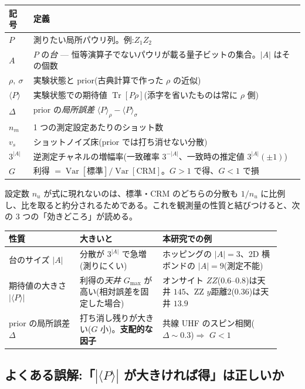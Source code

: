 \documentclass[11pt,a4paper]{ltjsarticle}
\newcommand{\ev}[1]{\langle #1\rangle}
\newcommand{\Tr}{\operatorname{Tr}}
\newcommand{\Var}{\operatorname{Var}}
\begin{document}
\begin{center}\small
\begin{tabular}{@{}ll@{}}
\toprule
記号 & 定義 \\
\midrule
$P$ & 測りたい局所パウリ列。例:$Z_1Z_2$ \\
$A$ & $P$ の\emph{台} --- 恒等演算子でないパウリが載る量子ビットの集合。$|A|$ はその個数 \\
$\rho,\ \sigma$ & 実験状態と prior(古典計算で作った $\rho$ の近似) \\
$\ev{P}$ & 実験状態での期待値 $\Tr[P\rho]$(添字を省いたものは常に $\rho$ 側) \\
$\Delta$ & prior の\emph{局所誤差} $\ev{P}_\rho-\ev{P}_\sigma$ \\
$n_m$ & 1 つの測定設定あたりのショット数 \\
$v_s$ & ショットノイズ床(prior では打ち消せない分散) \\
$3^{|A|}$ & 逆測定チャネルの増幅率(一致確率 $3^{-|A|}$、一致時の推定値 $3^{|A|}(\pm1)$) \\
$G$ & 利得 $=\Var[\text{標準}]/\Var[\text{CRM}]$。$G>1$ で得、$G<1$ で損 \\
\bottomrule
\end{tabular}
\end{center}

\noindent 設定数 $n_u$ が式に現れないのは、標準・CRM のどちらの分散も $1/n_u$ に比例し、比を取ると約分されるためである。これを観測量の性質と結びつけると、次の 3 つの「効きどころ」が読める。

\begin{center}
\begin{tabular}{@{}p{0.24\linewidth}p{0.28\linewidth}p{0.40\linewidth}@{}}
\toprule
性質 & 大きいと & 本研究での例 \\
\midrule
台のサイズ $|A|$ & 分散が $3^{|A|}$ で急増(測りにくい) & ホッピングの $|A|=3$、2D 横ボンドの $|A|=9$(測定不能) \\
期待値の大きさ $|\ev{P}|$ & 利得の\emph{天井} $G_{\max}$ が高い(相対誤差を固定した場合) & オンサイト $ZZ$($0.6$--$0.8$)は天井 $145$、ZZ $y$距離2($0.36$)は天井 $13.9$ \\
prior の局所誤差 $\Delta$ & 打ち消し残りが大きい($G$ 小)。\textbf{支配的な因子} & 共線 UHF のスピン相関($\Delta\sim0.3$)$\Rightarrow$ $G<1$ \\
\bottomrule
\end{tabular}
\end{center}

\subsection{よくある誤解:「$|\ev{P}|$ が大きければ得」は正しいか}
\label{sec:misconception}
\end{document}
